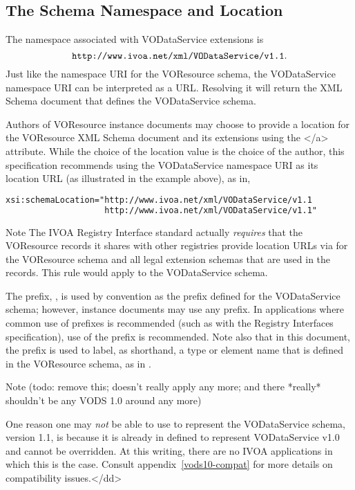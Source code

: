 \documentclass[11pt,a4paper]{ivoa}
\begin{document}
\subsection{The Schema Namespace and Location}


The namespace associated with VODataService extensions is
$$\mbox{\texttt{http://www.ivoa.net/xml/VODataService/v1.1}}.$$
Just like the namespace URI for the VOResource schema, the
VODataService namespace URI can be interpreted as a URL.  Resolving it
will return the XML Schema document 
that defines the VODataService schema.



Authors of VOResource instance documents may choose to
provide a location for the VOResource XML Schema document and its
extensions using the
</a> attribute.  While the choice of
the location value is the choice of the author, this specification
recommends using the VODataService namespace URI as its location URL
(as illustrated in the example above), as in,

\begin{lstlisting}[language=XML]
xsi:schemaLocation="http://www.ivoa.net/xml/VODataService/v1.1
                    http://www.ivoa.net/xml/VODataService/v1.1"
\end{lstlisting}


\begin{admonition}{Note}
The IVOA Registry Interface standard \citep{todo:RI1.1}
       actually \emph{requires} that the VOResource records it
       shares with other registries provide location URLs via
        for the VOResource schema and
       all legal extension schemas that are used in the records.  This
       rule would apply to the VODataService schema.
\end{admonition}


The prefix, , is used by convention as the prefix
defined for the VODataService schema; however, instance documents may
use any prefix.  In applications where common use of prefixes is
recommended (such as with the Registry Interfaces specification),
use of the  prefix is recommended.
Note also that in this document, the  prefix is used to
label, as shorthand, a type or element name that is defined in the
VOResource schema, as in .



\begin{admonition}{Note}
(todo: remove this; doesn't really apply any more; and there *really*
shouldn't be any VODS 1.0 around any more)

One reason one may \emph{not} be able to use 
       to represent the VODataService schema, version 1.1, is because
       it is already in defined to represent VODataService v1.0 and
       cannot be overridden.  At this writing, there are no IVOA
       applications in which this is the case.  Consult
       appendix~\ref{vods10-compat} for more details on
       compatibility issues.</dd>
\end{admonition}
\end{document}
